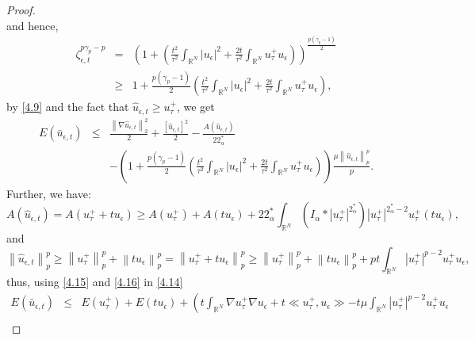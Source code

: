 \documentclass[11pt]{article}
\numberwithin{equation}{section}
\numberwithin{mytheorem}{section}
\begin{document}
\begin{proof}
\begin{equation*}
			\end{equation*}
			and hence, 
			\begin{eqnarray*}
				\zeta_{\epsilon,t}^{p\gamma_p-p} & = &  \left(1+\left(\frac{t^2}{\tau^2}\int_{\mathbb{R}^N}|u_{\epsilon}|^2+\frac{2t}{\tau^2}\int_{\mathbb{R}^N}u_{\tau}^+u_{\epsilon}\right)\right)^{\frac{p(\gamma_p-1)}{2}}\\
				& \geq &1+\frac{p(\gamma_p-1)}{2}\left(\frac{t^2}{\tau^2}\int_{\mathbb{R}^N}|u_{\epsilon}|^2+\frac{2t}{\tau^2}\int_{\mathbb{R}^N}u_{\tau}^+u_{\epsilon}\right),
			\end{eqnarray*}
			by \eqref{4.9} and the fact that $\hat{u}_{\epsilon,t}\geq u_{\tau}^+$, we get
			\begin{eqnarray}\label{4.14}
				E(\bar{u}_{\epsilon,t}) & \leq & \frac{\left\| \nabla \hat{u}_{\epsilon,t}\right\|_2^2}{2}+\frac{[\hat{u}_{\epsilon,t}]^2}{2}-\frac{A(\hat{u}_{\epsilon,t})}{22^*_{\alpha}}\nonumber\\
				& & -\left(1+\frac{p(\gamma_p-1)}{2}\left(\frac{t^2}{\tau^2}\int_{\mathbb{R}^N}|u_{\epsilon}|^2+\frac{2t}{\tau^2}\int_{\mathbb{R}^N}u_{\tau}^+u_{\epsilon}\right)\right)\frac{\mu\left\| \hat{u}_{\epsilon,t}\right\|_p^p}{p}.
			\end{eqnarray}
			Further, we have:
			\begin{equation}\label{4.15}
				A(\hat{u}_{\epsilon,t}) = A(u_{\tau}^++tu_{\epsilon}) \geq A(u_{\tau}^+)+A(tu_{\epsilon}) +22^*_{\alpha}\int_{\mathbb{R}^N}(I_{\alpha}*|u_{\tau}^+|^{2^*_{\alpha}})|u_{\tau}^+|^{2^*_{\alpha}-2}u_{\tau}^+(tu_{\epsilon}),
			\end{equation}
			and
			\begin{equation}\label{4.16}
				\left\| \hat{u}_{\epsilon,t} \right\|_p^p \geq \left\| u_{\tau}^+\right\|_p^p+\left\| tu_{\epsilon}\right\|_p^p= \left\| u_{\tau}^++tu_{\epsilon}\right\|_p^p\geq \left\| u_{\tau}^+\right\|_p^p+\left\| tu_{\epsilon}\right\|_p^p+pt\int_{\mathbb{R}^N}|u_{\tau}^+|^{p-2}u_{\tau}^+u_{\epsilon},
			\end{equation}
			thus, using \eqref{4.15} and \eqref{4.16} in \eqref{4.14} 
			\begin{eqnarray*}
				E(\bar{u}_{\epsilon,t}) & \leq & E(u_{\tau}^+)+E(tu_{\epsilon})+\left(t\int_{\mathbb{R}^N}\nabla u_{\tau}^+\nabla u_{\epsilon}+t\ll u_{\tau}^+,u_{\epsilon}\gg-t\mu\int_{\mathbb{R}^N}|u_{\tau}^+|^{p-2}u_{\tau}^+u_{\epsilon}\right.\\

\end{eqnarray*}
\end{proof}
\end{document}
